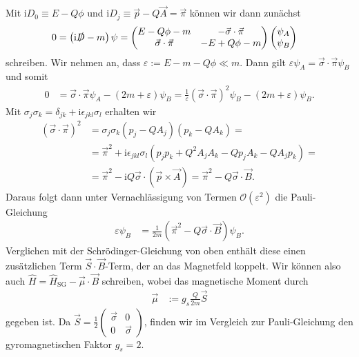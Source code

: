 \documentclass[english, parskip=full]{scrreport}
\newcommand{\kla}{}
\newcommand{\tecxt}{}
\renewcommand{\i}{\text{i}}
\begin{document}
Mit $\i D_0 \equiv E - Q\phi$ und $\i D_j \equiv \vec{p} - Q\vec{A} = \vec{\pi}$ können wir dann zunächst
\begin{align}
0 &= \kla\left( \i\slashed{D} - m \right)\psi = \begin{pmatrix}
E - Q\phi - m & -\vec{\sigma}\cdot\kla\vec{\pi} \\ 
\vec{\sigma}\cdot\vec{\pi} & -E + Q\phi - m
\end{pmatrix}\begin{pmatrix}
\psi_A \\ \psi_B
\end{pmatrix}
\end{align}
schreiben. 
Wir nehmen an, dass $\varepsilon := E-m-Q\phi \ll m$.
Dann gilt $\varepsilon \psi_A = \vec{\sigma}\cdot\vec{\pi}\psi_B$ und somit
\begin{align}
0 &= \vec{\sigma}\cdot\vec{\pi}\psi_A - \kla\left( 2m + \varepsilon \right)\psi_B = \frac{1}{\varepsilon}\kla\left( \vec{\sigma}\cdot\vec{\pi} \right)^2\psi_B - \kla\left( 2m + \varepsilon \right)\psi_B.
\end{align}
Mit $\sigma_j\sigma_k = \delta_{jk} + \i\epsilon_{jkl}\sigma_l$ erhalten wir
\begin{align}
\kla\left( \vec{\sigma}\cdot\vec{\pi} \right)^2 &= \sigma_j\sigma_k \kla\left( p_j - QA_j \right)\kla\left( p_k - QA_k \right) = \\
&= \vec{\pi}^2 + \i\epsilon_{jkl}\sigma_l \kla\left( p_jp_k + Q^2A_jA_k  - Qp_jA_k - QA_jp_k \right) = \\
&= \vec{\pi}^2 - \i Q\vec{\sigma}\cdot\kla\left( \vec{p}\times\vec{A} \right) = \vec{\pi}^2 - Q\vec{\sigma}\cdot\vec{B}.
\end{align} 
Daraus folgt dann unter Vernachlässigung von Termen $\mathcal{O}(\varepsilon^2)$ die Pauli-Gleichung
\begin{align}
\varepsilon\psi_B &= \frac{1}{2m}\kla\left( \vec{\pi}^2 - Q\vec{\sigma}\cdot\vec{B} \right)\psi_B.
\end{align}
Verglichen mit der Schrödinger-Gleichung von oben enthält diese einen zusätzlichen Term $\vec{S}\cdot\vec{B}$-Term, der an das Magnetfeld koppelt.
Wir können also auch $\hat{H} = \hat{H}_\tecxt\text{SG} - \vec{\mu}\cdot \vec{B}$ schreiben, wobei das magnetische Moment durch
\begin{align}
\vec{\mu} &:= g_s \frac{Q}{2m}\vec{S}
\end{align}
gegeben ist.
Da $\vec{S} = \frac{1}{2}\begin{pmatrix}
\vec{\sigma}  & 0 \\ 0 & \vec{\sigma}
\end{pmatrix}$, finden wir im Vergleich zur Pauli-Gleichung den gyromagnetischen Faktor $g_s = 2$.
\end{document}
